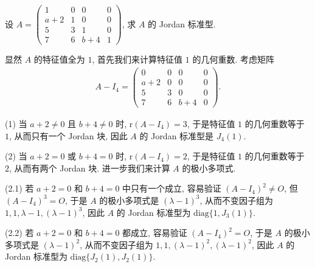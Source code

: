 \documentclass[../../main.tex]{subfiles}
\begin{document}
\begin{example}
设 $A = \begin{pmatrix}
1 & 0 & 0 & 0 \\
a + 2 & 1 & 0 & 0 \\
5 & 3 & 1 & 0 \\
7 & 6 & b + 4 & 1
\end{pmatrix}$, 求 $A$ 的 Jordan 标准型.
\end{example}
\begin{solution}
显然 $A$ 的特征值全为 $1$, 首先我们来计算特征值 $1$ 的几何重数. 考虑矩阵
\begin{align*}
A - I_4 = \begin{pmatrix}
0 & 0 & 0 & 0 \\
a + 2 & 0 & 0 & 0 \\
5 & 3 & 0 & 0 \\
7 & 6 & b + 4 & 0
\end{pmatrix}.
\end{align*}

(1) 当 $a + 2 \neq 0$ 且 $b + 4 \neq 0$ 时, $\mathrm{r}(A - I_4) = 3$, 于是特征值 $1$ 的几何重数等于 $1$, 从而只有一个 Jordan 块, 因此 $A$ 的 Jordan 标准型是 $J_4(1)$.

(2) 当 $a + 2 = 0$ 或 $b + 4 = 0$ 时, $\mathrm{r}(A - I_4) = 2$, 于是特征值 $1$ 的几何重数等于 $2$, 从而有两个 Jordan 块. 进一步我们来计算 $A$ 的极小多项式.

(2.1) 若 $a + 2 = 0$ 和 $b + 4 = 0$ 中只有一个成立, 容易验证 $(A - I_4)^2 \neq O$, 但 $(A - I_4)^3 = O$, 于是 $A$ 的极小多项式是 $(\lambda - 1)^3$, 从而不变因子组为 $1,1,\lambda - 1,(\lambda - 1)^3$, 因此 $A$ 的 Jordan 标准型为 $\mathrm{diag}\{1,J_3(1)\}$.

(2.2) 若 $a + 2 = 0$ 和 $b + 4 = 0$ 都成立, 容易验证 $(A - I_4)^2 = O$, 于是 $A$ 的极小多项式是 $(\lambda - 1)^2$, 从而不变因子组为 $1,1,(\lambda - 1)^2,(\lambda - 1)^2$, 因此 $A$ 的 Jordan 标准型为 $\mathrm{diag}\{J_2(1),J_2(1)\}$. 

\end{solution}
\end{document}

